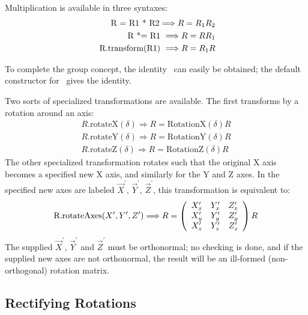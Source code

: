 Multiplication is available in three syntaxes:
\begin{eqnarray}
\label{eq:opmulrot}
	\mbox{ R = R1 * R2} \Longrightarrow {\boldmath R = R_1 R_2}
\label{eq:opstrot}
	\\
	\mbox{ R *= R1 } \Longrightarrow {\boldmath R = R R_1 }
	\\
\label{eq:transrot}
	\mbox{ R.transform(R1) } \Longrightarrow {\boldmath R = R_1 R }
\end{eqnarray}

To complete the group concept, the identity \Ro\ can easily be obtained; the
default constructor for \Ro\ gives the identity.

Two sorts of specialized transformations are available.  The first transforms
by a rotation around an axis:
\begin{eqnarray}
\label{eq:xyzrot}
  R\mbox{.rotateX}(\delta) \Longrightarrow R = \mbox{RotationX}(\delta) R \\
\nonumber
  R\mbox{.rotateY}(\delta) \Longrightarrow R = \mbox{RotationY}(\delta) R \\
\nonumber
  R\mbox{.rotateZ}(\delta) \Longrightarrow R = \mbox{RotationZ}(\delta) R 
\end{eqnarray}
\noindent
The other specialized transformation rotates such that the original X axis
becomes a specified new X axis, and similarly for the Y and Z axes.
In the specified new axes are labeled $\vec{X}^\prime$, $\vec{Y}^\prime$, 
$\vec{Z}^\prime$, this transformation is equivalent to:
\begin{equation}
\label{eq:rotaxes}
\mbox{R.rotateAxes}(X^\prime, Y^\prime, Z^\prime) \Longrightarrow
{\boldmath R} = 
\left(
\begin{array}{ccc}
X^\prime_x & Y^\prime_x & Z^\prime_x \\
X^\prime_y & Y^\prime_y & Z^\prime_y \\
X^\prime_z & Y^\prime_z & Z^\prime_z 
\end{array}
\right)
{\boldmath R} 
\end{equation}
\noindent
The supplied 
$\vec{X}^\prime$, $\vec{Y}^\prime$ and $\vec{Z}^\prime$ must be orthonormal;
no checking is done, and if the supplied new axes are not orthonormal, the
result will be an ill-formed (non-orthogonal) rotation matrix.

\subsection{Rectifying Rotations}

